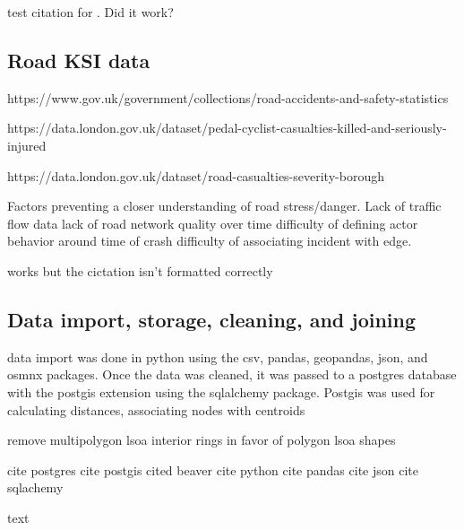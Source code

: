 	
	
test citation for \cite{lsoageoms}. Did it work?
	
\subsection{Road KSI data}
	
https://www.gov.uk/government/collections/road-accidents-and-safety-statistics

https://data.london.gov.uk/dataset/pedal-cyclist-casualties-killed-and-seriously-injured

https://data.london.gov.uk/dataset/road-casualties-severity-borough


Factors preventing a closer understanding of road stress/danger. 
	Lack of traffic flow data
	lack of road network quality over time
	difficulty of defining actor behavior around time of crash
	difficulty of associating incident with edge.

works but the cictation isn't formatted correctly
\cite{cyclistksi}
	
\subsection{Data import, storage, cleaning, and joining}

data import was done in python using the csv, pandas, geopandas, json, and osmnx packages. Once the data was cleaned, it was passed to a postgres database with the postgis extension using the sqlalchemy package. Postgis was used for calculating distances, associating nodes with centroids

remove multipolygon lsoa interior rings in favor of polygon lsoa shapes

cite postgres
cite postgis
cited beaver
cite python
cite pandas
cite json
cite sqlachemy

text